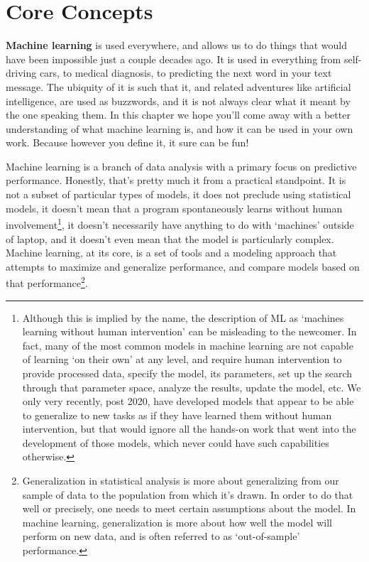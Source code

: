 \documentclass[
  letterpaper,
]{krantz}
\begin{document}
\chapter{Core Concepts}\label{sec-ml-core-concepts}

\textbf{Machine learning} is used everywhere, and allows us to do things
that would have been impossible just a couple decades ago. It is used in
everything from self-driving cars, to medical diagnosis, to predicting
the next word in your text message. The ubiquity of it is such that it,
and related adventures like artificial intelligence, are used as
buzzwords, and it is not always clear what it meant by the one speaking
them. In this chapter we hope you'll come away with a better
understanding of what machine learning is, and how it can be used in
your own work. Because however you define it, it sure can be fun!

Machine learning is a branch of data analysis with a primary focus on
predictive performance. Honestly, that's pretty much it from a practical
standpoint. It is not a subset of particular types of models, it does
not preclude using statistical models, it doesn't mean that a program
spontaneously learns without human involvement\footnote{Although this is
  implied by the name, the description of ML as `machines learning
  without human intervention' can be misleading to the newcomer. In
  fact, many of the most common models in machine learning are not
  capable of learning `on their own' at any level, and require human
  intervention to provide processed data, specify the model, its
  parameters, set up the search through that parameter space, analyze
  the results, update the model, etc. We only very recently, post 2020,
  have developed models that appear to be able to generalize to new
  tasks as if they have learned them without human intervention, but
  that would ignore all the hands-on work that went into the development
  of those models, which never could have such capabilities otherwise.},
it doesn't necessarily have anything to do with `machines' outside of
laptop, and it doesn't even mean that the model is particularly complex.
Machine learning, at its core, is a set of tools and a modeling approach
that attempts to maximize and generalize performance, and compare models
based on that performance\footnote{Generalization in statistical
  analysis is more about generalizing from our sample of data to the
  population from which it's drawn. In order to do that well or
  precisely, one needs to meet certain assumptions about the model. In
  machine learning, generalization is more about how well the model will
  perform on new data, and is often referred to as `out-of-sample'
  performance.}.
\end{document}
